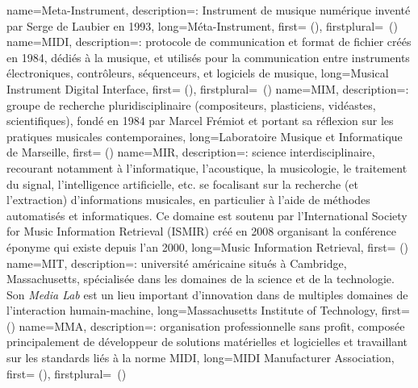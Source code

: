 {
    name={Meta-Instrument},
    description={\textit{}: Instrument de musique numérique inventé par Serge de Laubier en 1993},
    long={Méta-Instrument},
    first={ ()},
    firstplural={\glspluralsuffix\ (\glspluralsuffix)}
}
{
    name={MIDI},
    description={\textit{}: protocole de communication et format de fichier créés en 1984, dédiés à la musique, et utilisés pour la communication entre instruments électroniques, contrôleurs, séquenceurs, et logiciels de musique},
    long={Musical Instrument Digital Interface},
   	first={ ()},
    firstplural={\glspluralsuffix\ (\glspluralsuffix)}
}
{
    name={MIM},
    description={\textit{}: groupe de recherche pluridisciplinaire (compositeurs, plasticiens, vidéastes, scientifiques), fondé en 1984 par Marcel Frémiot et portant sa réflexion sur les pratiques musicales contemporaines},
    long={Laboratoire Musique et Informatique de Marseille},
    first={ ()}
}
{
    name={MIR},
    description={\textit{}: science interdisciplinaire, recourant notamment à l'informatique, l'acoustique, la musicologie, le traitement du signal, l'intelligence artificielle, etc. se focalisant sur la recherche (et l'extraction) d'informations musicales, en particulier à l'aide de méthodes automatisés et informatiques. Ce domaine est soutenu par l'International Society for Music Information Retrieval (ISMIR) créé en 2008 organisant la conférence éponyme qui existe depuis l'an 2000},
    long={Music Information Retrieval},
    first={ ()}
}
{
    name={MIT},
    description={\textit{}: université américaine situés à Cambridge, Massachusetts, spécialisée dans les domaines de la science et de la technologie. Son \textit{Media Lab} est un lieu important d'innovation dans de multiples domaines de l'interaction humain-machine},
    long={Massachusetts Institute of Technology},
    first={ ()}
}
{
    name={MMA},
    description={\textit{}: organisation professionnelle sans profit, composée principalement de développeur de solutions matérielles et logicielles et travaillant sur les standards liés à la norme MIDI},
    long={MIDI Manufacturer Association},
    first={ ()},
    firstplural={\glspluralsuffix\ (\glspluralsuffix)}
}
